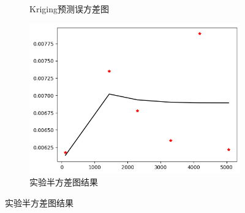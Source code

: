 \documentclass[12pt,a4paper]{nmmcm}
\begin{document}
\begin{enumerate}
\begin{figure}[H]
\begin{subfigure}[b]{0.3\textwidth}
            \caption{Kriging预测误方差图}
            \label{fig:porosity-error-Kriging-3d}
          \end{subfigure}
          \hfill
          \begin{subfigure}[b]{0.3\textwidth}
            \centering
            \includegraphics[width=\textwidth]{figures/task2/task2-5-3.png}
            \caption{实验半方差图结果}
            \label{fig:KrigingSemivariogram1}
          \end{subfigure}
        \end{figure}


\end{enumerate}
\end{document}
